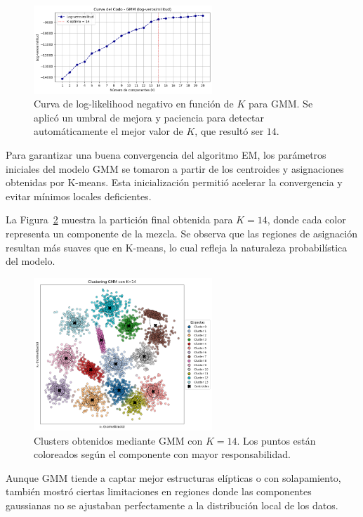 \documentclass[11pt]{article}
\begin{document}
\begin{figure}[H]
    \centering
    \includegraphics[width=0.6\textwidth]{figures/gmm_elbow_threshold.png}
    \caption{Curva de log-likelihood negativo en función de $K$ para GMM. Se aplicó un umbral de mejora y paciencia para detectar automáticamente el mejor valor de $K$, que resultó ser $14$.}
    \label{fig:gmm_elbow_auto}
\end{figure}

Para garantizar una buena convergencia del algoritmo EM, los parámetros iniciales del modelo GMM se tomaron a partir de los centroides y asignaciones obtenidas por K-means. Esta inicialización permitió acelerar la convergencia y evitar mínimos locales deficientes.

La Figura~\ref{fig:gmm_clusters_14} muestra la partición final obtenida para $K = 14$, donde cada color representa un componente de la mezcla. Se observa que las regiones de asignación resultan más suaves que en K-means, lo cual refleja la naturaleza probabilística del modelo.

\begin{figure}[H]
    \centering
    \includegraphics[width=0.6\textwidth]{figures/gmm_clusters_k14.png}
    \caption{Clusters obtenidos mediante GMM con $K = 14$. Los puntos están coloreados según el componente con mayor responsabilidad.}
    \label{fig:gmm_clusters_14}
\end{figure}

Aunque GMM tiende a captar mejor estructuras elípticas o con solapamiento, también mostró ciertas limitaciones en regiones donde las componentes gaussianas no se ajustaban perfectamente a la distribución local de los datos.
\end{document}

